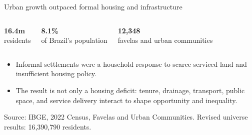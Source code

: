\documentclass[10pt,aspectratio=169]{beamer}
\newcommand{\source}[1]{%
  \par\vfill{\tiny\color{MidGray}Source: #1}}
\newcommand{\muted}[1]{\textcolor{MidGray}{#1}}
\begin{document}
\begin{frame}{Urban growth outpaced formal housing and infrastructure}
  \begin{columns}[T,onlytextwidth]
      \begin{center}
        {\fontsize{32}{36}\selectfont\color{BrazilGreen}\textbf{16.4m}}\\[-.05cm]
        \muted{residents}
      \end{center}
      \begin{center}
        {\fontsize{32}{36}\selectfont\color{DeepNavy}\textbf{8.1\%}}\\[-.05cm]
        \muted{of Brazil's population}
      \end{center}
      \begin{center}
        {\fontsize{32}{36}\selectfont\color{Brick}\textbf{12,348}}\\[-.05cm]
        \muted{favelas and urban communities}
      \end{center}
  \end{columns}
  \vspace{.5cm}
  \begin{itemize}
    \item Informal settlements were a household response to scarce serviced land and insufficient housing policy.
    \item The result is not only a housing deficit: tenure, drainage, transport, public space, and service delivery interact to shape opportunity and inequality.
  \end{itemize}
  \source{IBGE, 2022 Census, Favelas and Urban Communities. Revised universe results: 16,390,790 residents.}
\end{frame}
\end{document}
